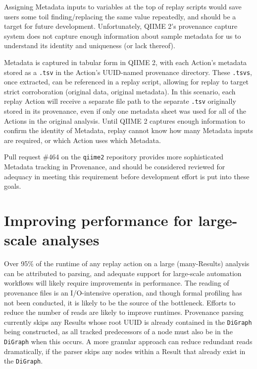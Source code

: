 Assigning Metadata inputs to variables at the top of replay scripts would save
users some toil finding/replacing the same value repeatedly, and should be a
target for future development. Unfortunately, QIIME 2’s provenance capture
system does not capture enough information about sample metadata for us to
understand its identity and uniqueness (or lack thereof).

Metadata is captured in tabular form in QIIME 2, with each Action’s metadata
stored as a \texttt{.tsv} in the Action’s UUID-named provenance directory. These \texttt{.tsvs},
once extracted, can be referenced in a replay script, allowing for replay to
target strict corroboration (original data, original metadata). In this
scenario, each replay Action will receive a separate file path to the separate
\texttt{.tsv} originally stored in its provenance, even if only one metadata sheet was
used for all of the Actions in the original analysis. Until QIIME 2 captures
enough information to confirm the identity of Metadata, replay cannot know how
many Metadata inputs are required, or which Action uses which Metadata.

Pull request \#464 on the \texttt{qiime2} repository \parencite{qiime_2_development_team_pull_2016}
provides more sophisticated Metadata tracking in Provenance, and should be
considered reviewed for adequacy in meeting this requirement before development
effort is put into these goals.

\section{Improving performance for large-scale analyses \parencite[Issue 29]{keefe_issues_2021}}

Over 95\% of the runtime of any replay action on a large (many-Results) analysis
can be attributed to parsing, and adequate support for large-scale automation
workflows will likely require improvements in performance. The reading of
provenance files is an I/O-intensive operation, and though formal profiling has
not been conducted, it is likely to be the source of the bottleneck. Efforts to
reduce the number of reads are likely to improve runtimes. Provenance parsing
currently skips any Results whose root UUID is already contained in the \texttt{DiGraph}
being constructed, as all tracked predecessors of a node must also be in the
\texttt{DiGraph} when this occurs. A more granular approach can reduce redundant reads
dramatically, if the parser skips any nodes within a Result that already exist
in the \texttt{DiGraph}.

